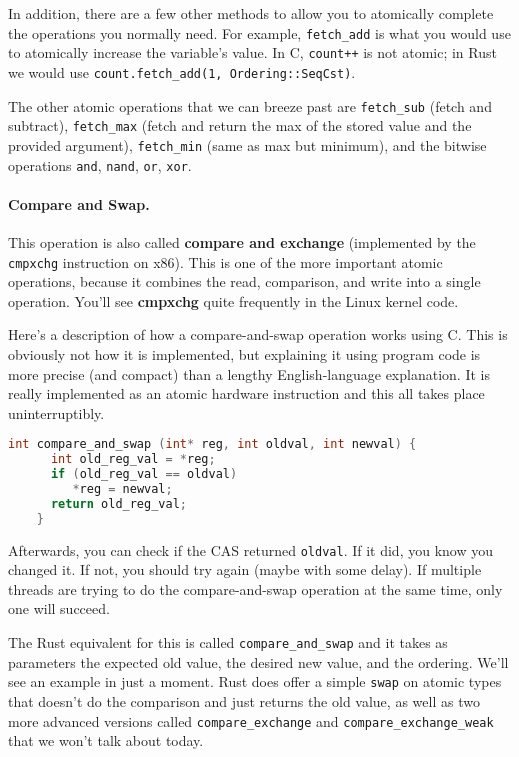 In addition, there are a few other methods to allow you to atomically complete the operations you normally need. For example, \texttt{fetch\_add} is what you would use to atomically increase the variable's value. In C, \texttt{count++} is not atomic; in Rust we would use \texttt{count.fetch\_add(1, Ordering::SeqCst)}.

The other atomic operations that we can breeze past are \texttt{fetch\_sub} (fetch and subtract), \texttt{fetch\_max} (fetch and return the max of the stored value and the provided argument), \texttt{fetch\_min} (same as max but minimum), and the bitwise operations \texttt{and}, \texttt{nand}, \texttt{or}, \texttt{xor}.


\paragraph{Compare and Swap.} This operation is also called {\bf compare and exchange} (implemented by the {\tt cmpxchg} instruction on x86). This is one of the more important atomic operations, because it combines the read, comparison, and write into a single operation. You'll see {\bf cmpxchg} quite frequently in the Linux kernel code.

Here's a description of how a compare-and-swap operation works using C. This is obviously not how it is implemented, but explaining it using program code is more precise (and compact) than a lengthy English-language explanation. It is really implemented as an atomic hardware instruction and this all takes place uninterruptibly. 

  \begin{lstlisting}[language=C]
    int compare_and_swap (int* reg, int oldval, int newval) {
      int old_reg_val = *reg;
      if (old_reg_val == oldval) 
         *reg = newval;
      return old_reg_val;
    }
  \end{lstlisting}

Afterwards, you can check if the CAS returned {\tt oldval}. If it did, you know you changed it. If not, you should try again (maybe with some delay). If multiple threads are trying to do the compare-and-swap operation at the same time, only one will succeed. 

The Rust equivalent for this is called \texttt{compare\_and\_swap} and it takes as parameters the expected old value, the desired new value, and the ordering. We'll see an example in just a moment. Rust does offer a simple \texttt{swap} on atomic types that doesn't do the comparison and just returns the old value, as well as two more advanced versions called \texttt{compare\_exchange} and \texttt{compare\_exchange\_weak} that we won't talk about today.

